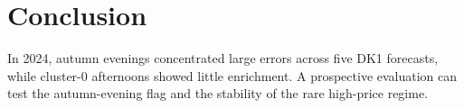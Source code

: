 \section{Conclusion}
In 2024, autumn evenings concentrated large errors across five DK1
forecasts, while cluster-0 afternoons showed little enrichment.
A prospective evaluation can test the autumn-evening flag and the
stability of the rare high-price regime.
